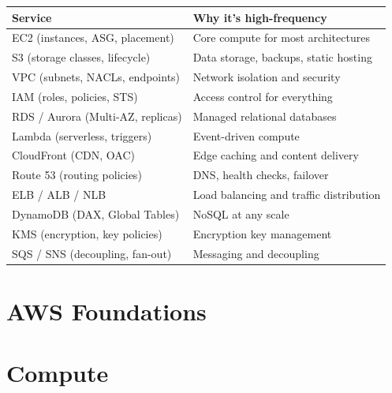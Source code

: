 \documentclass[12pt, a4paper]{article}
\begin{document}
\begin{comparebox}[title={Services that appear in almost every exam}]
\begin{tabular}{@{}p{5cm}p{7cm}@{}}
\toprule
\textbf{Service} & \textbf{Why it's high-frequency} \\
\midrule
EC2 (instances, ASG, placement)    & Core compute for most architectures \\[2pt]
S3 (storage classes, lifecycle)    & Data storage, backups, static hosting \\[2pt]
VPC (subnets, NACLs, endpoints)    & Network isolation and security \\[2pt]
IAM (roles, policies, STS)         & Access control for everything \\[2pt]
RDS / Aurora (Multi-AZ, replicas)  & Managed relational databases \\[2pt]
Lambda (serverless, triggers)      & Event-driven compute \\[2pt]
CloudFront (CDN, OAC)              & Edge caching and content delivery \\[2pt]
Route 53 (routing policies)        & DNS, health checks, failover \\[2pt]
ELB / ALB / NLB                    & Load balancing and traffic distribution \\[2pt]
DynamoDB (DAX, Global Tables)      & NoSQL at any scale \\[2pt]
KMS (encryption, key policies)     & Encryption key management \\[2pt]
SQS / SNS (decoupling, fan-out)    & Messaging and decoupling \\[2pt]
\bottomrule
\end{tabular}
\end{comparebox}

\newpage

\part{AWS Foundations}




\part{Compute}
\end{document}
